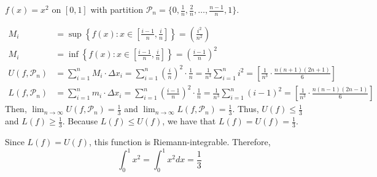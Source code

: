 \begin{example}
    $f(x) = x^2$ on $[0, 1]$ with partition $\mathcal{\mathcal{P}}_n = \{0, \frac{1}{n}, \frac{2}{n}, \ldots, \frac{n - 1}{n}, 1\}$.

    \begin{align*}
        M_i &= \sup \left\{f(x) : x \in \left[\frac{i - 1}{n}, \frac{i}{n}\right]\right\} = \left(\frac{i^2}{n^2}\right) \\
        M_i &= \inf \left\{f(x) : x \in \left[\frac{i - 1}{n}, \frac{i}{n}\right]\right\} = \left(\frac{i - 1}{n}\right)^2 \\
        U(f, \mathcal{\mathcal{P}}_n) &= \sum_{i = 1}^n M_i \cdot \Delta x_i = \sum_{i = 1}^n \left(\frac{i}{n}\right)^2 \cdot \frac{1}{n} = \frac{1}{n^3} \sum_{i = 1}^n i^2 = \left[\frac{1}{n^3} \cdot \frac{n(n + 1)(2n + 1)}{6}\right] \\
        L(f, \mathcal{\mathcal{P}}_n) &= \sum_{i = 1}^n m_i \cdot \Delta x_i = \sum_{i = 1}^n \left(\frac{i - 1}{n}\right)^2 \cdot \frac{1}{n} = \frac{1}{n^3} \sum_{i = 1}^n (i - 1)^2 = \left[\frac{1}{n^3} \cdot \frac{n(n - 1)(2n - 1)}{6}\right]
    \end{align*}
    Then, $\lim_{n \to \infty} U(f, \mathcal{\mathcal{P}}_n) = \frac{1}{3}$ and $\lim_{n \to \infty} L(f, \mathcal{\mathcal{P}}_n) = \frac{1}{3}$. Thus, $U(f) \leq \frac{1}{3}$ and $L(f) \geq \frac{1}{3}$. Because $L(f) \leq U(f)$, we have that $L(f) = U(f) = \frac{1}{3}$.

    Since $L(f) = U(f)$, this function is Riemann-integrable. Therefore, $$\int_0^1 x^2 = \int_0^1 x^2dx = \frac{1}{3}$$
\end{example}

